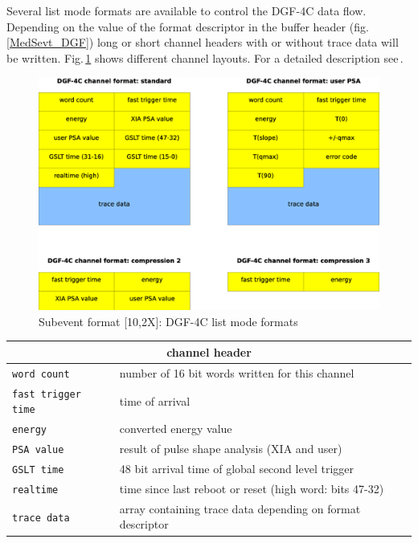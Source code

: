 \documentclass[10pt]{article}
\begin{document}
\newpage
Several list mode formats are available to control the DGF-4C data flow. Depending on the value of the format descriptor in
the buffer header (fig.\,\ref{MedSevt_DGF}) long or short channel headers with or without trace data will be written.
Fig.\,\ref{MedSevt_DGF_ChannelFormats} shows different channel layouts.
For a detailed description see\,\cite{XIAManuals}.
\begin{figure}[H]
\centerline{\includegraphics[width=\linewidth]{MedSevt_DGF_ChannelFormats}}
\caption{Subevent format [10,2X]: DGF-4C list mode formats}
\label{MedSevt_DGF_ChannelFormats}
\end{figure}
\begin{minipage}{\linewidth}
\begin{table}[H]
\begin{center}
\begin{tabular}{ll}
\hline
\multicolumn{2}{c}{channel header} \\
\hline
\verb+word count+ & number of 16 bit words written for this channel \\
\verb+fast trigger time+ & time of arrival \\
\verb+energy+ & converted energy value \\
\verb+PSA value+ & result of pulse shape analysis (XIA and user) \\
\verb+GSLT time+ & 48 bit arrival time of global second level trigger \\
\verb+realtime+ & time since last reboot or reset (high word: bits 47-32) \\
\verb+trace data+ & array containing trace data depending on format descriptor \\
\hline
\end{tabular}
\end{center}
\label{MedSevt_DGF_ChannelFormats_Legend}
\end{table}
\end{minipage}
\newpage
\end{document}
